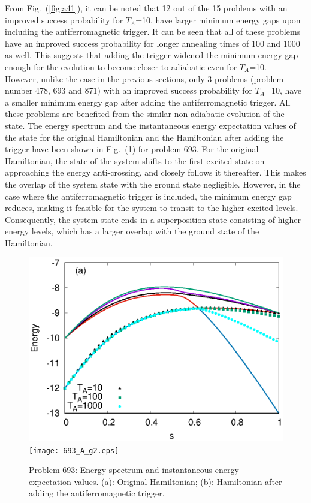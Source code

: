 \documentclass[../main.tex]{subfiles}
\begin{document}
From Fig.~(\ref{fig:a41}), it can be noted that 12 out of the 15 problems with an improved success probability for $T_A$=10, have larger minimum energy gaps upon including the antiferromagnetic trigger. It can be seen that all of these problems have an improved success probability for longer annealing times of 100 and 1000 as well. This suggests that adding the trigger widened the minimum energy gap enough for the evolution to become closer to adiabatic even for $T_A$=10.\\

However, unlike the case in the previous sections, only 3 problems (problem number 478, 693 and 871) with an improved success probability for $T_A$=10, have a smaller minimum energy gap after adding the antiferromagnetic trigger. All these problems are benefited from the similar non-adiabatic evolution of the state. The energy spectrum and the instantaneous energy expectation values of the state for the original Hamiltonian and the Hamiltonian after adding the trigger have been shown in Fig.~(\ref{fig:a42}) for problem 693. For the original Hamiltonian, the state of the system shifts to the first excited state on approaching the energy anti-crossing, and closely follows it thereafter. This makes the overlap of the system state with the ground state negligible. However, in the case where the antiferromagnetic trigger is included, the minimum energy gap reduces, making it feasible for the system to transit to the higher excited levels. Consequently, the system state ends in a superposition state consisting of higher energy levels, which has a larger overlap with the ground state of the Hamiltonian.


\begin{figure}
\centering 
\includegraphics[scale=0.8]{693_O_g2.eps}
\texttt{[image: 693\_A\_g2.eps]}
\caption{Problem 693: Energy spectrum and instantaneous energy expectation values.  (a): Original Hamiltonian; (b): Hamiltonian after adding the antiferromagnetic trigger.}
\label{fig:a42}
\end{figure}
\end{document}
